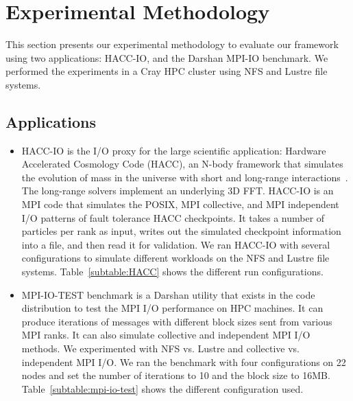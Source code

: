 \section{Experimental Methodology}\label{sec:methodology}
This section presents our experimental methodology to evaluate our
framework using two applications:
HACC-IO, 
and the Darshan MPI-IO benchmark. We performed the experiments in a Cray HPC cluster using NFS and Lustre file systems.

\subsection{Applications}
\begin{itemize}
	\item HACC-IO is the I/O proxy for the large scientific application: Hardware Accelerated Cosmology Code (HACC), an N-body framework that simulates the evolution of mass in the universe with short and long-range interactions~\cite{habib2013hacc}. The long-range solvers implement an underlying 3D FFT. HACC-IO is an MPI code that simulates the POSIX, MPI collective, and MPI independent I/O patterns of fault tolerance HACC checkpoints. It takes a number of particles per rank as input, writes out the simulated checkpoint information into a file, and then read it for validation. We ran HACC-IO with several configurations to simulate different workloads on the NFS and Lustre file systems. Table~\ref{subtable:HACC} shows the different run configurations. 
	\item MPI-IO-TEST benchmark is a Darshan utility that exists in the code distribution to test the MPI I/O performance on HPC machines. It can produce iterations of messages with different block sizes sent from various MPI ranks. It can also simulate collective and independent MPI I/O methods. We experimented with NFS vs. Lustre and collective vs. independent MPI I/O. We ran the benchmark with four configurations on 22 nodes and set the number of iterations to 10 and the block size to 16MB. Table~\ref{subtable:mpi-io-test} shows the different configuration used.
\end{itemize}

